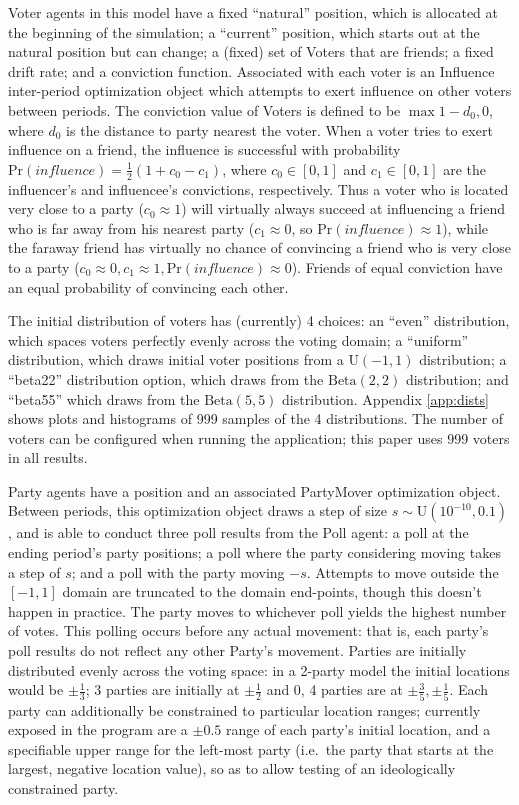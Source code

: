\documentclass[12pt]{article}
\numberwithin{equation}{subsection}
\begin{document}
Voter agents in this model have a fixed ``natural'' position, which is allocated at
the beginning of the simulation; a ``current'' position, which starts out at the natural position
but can change; a (fixed) set of Voters that are friends; a fixed drift rate; and a conviction
function.  Associated with each voter is an Influence inter-period optimization object which
attempts to exert influence on other voters between periods.  The conviction value of Voters is
defined to be $\max{1 - d_0, 0}$, where $d_0$ is the distance to party nearest the voter.  When a
voter tries to exert influence on a friend, the influence is successful with probability
$\textrm{Pr}(influence) = \frac{1}{2}(1 + c_0 - c_1)$, where $c_0 \in [0,1]$ and $c_1 \in [0,1]$ are the influencer's and influencee's
convictions, respectively.  Thus a voter who is located very close to a party ($c_0 \approx 1$) will
virtually always succeed at influencing a friend who is far away from his nearest party ($c_1
\approx 0$, so $\textrm{Pr}(influence) \approx 1$), while the faraway friend has virtually no chance of convincing
a friend who is very close to a party ($c_0 \approx 0, c_1 \approx 1, \textrm{Pr}(influence) \approx
0$).  Friends of equal conviction have an equal probability of convincing each other.

The initial distribution of voters has (currently) 4 choices: an ``even'' distribution, which spaces
voters perfectly evenly across the voting domain; a ``uniform'' distribution, which draws initial
voter positions from a $\textrm{U}(-1,1)$ distribution; a ``beta22'' distribution option, which
draws from the $\textrm{Beta}(2, 2)$ distribution; and ``beta55'' which draws from the
$\textrm{Beta}(5, 5)$ distribution.  Appendix \ref{app:dists} shows plots and histograms of 999
samples of the 4 distributions.  The number of voters can be configured when running the
application; this paper uses 999 voters in all results.

Party agents have a position and an associated PartyMover optimization object.  Between periods,
this optimization object draws a step of size $s \sim \textrm{U}(10^{-10}, 0.1)$, and is able to
conduct three poll results from the Poll agent: a poll at the ending period's party positions; a
poll where the party considering moving takes a step of $s$; and a poll with the party moving $-s$.
Attempts to move outside the $[-1,1]$ domain are truncated to the domain end-points, though this
doesn't happen in practice.  The party moves to whichever poll yields the highest number of votes.
This polling occurs before any actual movement: that is, each party's poll results do not reflect
any other Party's movement.  Parties are initially distributed evenly across the voting space: in a
2-party model the initial locations would be $\pm\frac{1}{3}$; 3 parties are initially at
$\pm\frac{1}{2}$ and 0, 4 parties are at $\pm \frac 3 5, \pm \frac 1 5$.  Each party can
additionally be constrained to particular location ranges; currently exposed in the program are a $\pm 0.5$
range of each party's initial location, and a specifiable upper range for the left-most party
(i.e.\ the party that starts at the largest, negative location value), so as to allow testing of an
ideologically constrained party.
\end{document}
